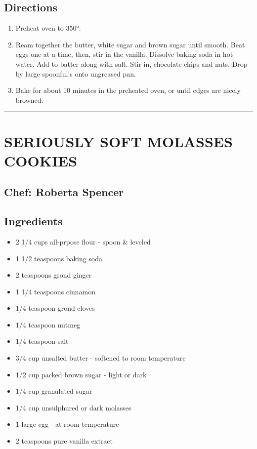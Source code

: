 \documentclass[
]{book}
\providecommand{\tightlist}{%
  \setlength{\itemsep}{0pt}\setlength{\parskip}{0pt}}
\begin{document}
\hypertarget{directions-93}{%
\subsection*{Directions}\label{directions-93}}


\begin{enumerate}
\def\labelenumi{\arabic{enumi}.}
\tightlist
\item
  Preheat oven to 350°.
\item
  Ream together the butter, white sugar and brown sugar until smooth. Beat eggs one at a time, then, stir in the vanilla. Dissolve baking soda in hot water. Add to batter along with salt. Stir in, chocolate chips and nuts. Drop by large spoonful's onto ungreased pan.
\item
  Bake for about 10 minutes in the preheated oven, or until edges are nicely browned.
\end{enumerate}

\begin{center}\rule{0.5\linewidth}{0.5pt}\end{center}

\hypertarget{seriously-soft-molasses-cookies}{%
\section*{SERIOUSLY SOFT MOLASSES COOKIES}\label{seriously-soft-molasses-cookies}}


\hypertarget{chef-roberta-spencer-32}{%
\subsection*{Chef: Roberta Spencer}\label{chef-roberta-spencer-32}}


\hypertarget{ingredients-94}{%
\subsection*{Ingredients}\label{ingredients-94}}


\begin{itemize}
\tightlist
\item
  2 1/4 cups all-prpose flour - spoon \& leveled
\item
  1 1/2 teaspoons baking soda
\item
  2 teaspoons grond ginger
\item
  1 1/4 teaspoons cinnamon
\item
  1/4 teaspoon grond cloves
\item
  1/4 teaspoon nutmeg
\item
  1/4 teaspoon salt
\item
  3/4 cup unsalted butter - softened to room temperature
\item
  1/2 cup packed brown sugar - light or dark
\item
  1/4 cup granulated sugar
\item
  1/4 cup unsulphured or dark molasses
\item
  1 large egg - at room temperature
\item
  2 teaspoons pure vanilla extract
\end{itemize}
\end{document}
